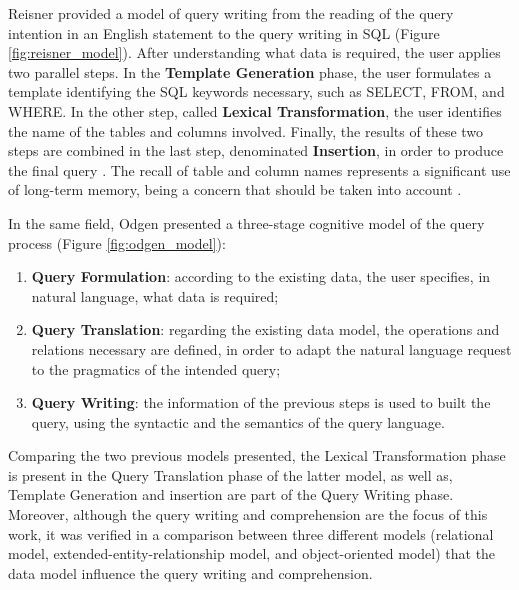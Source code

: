 Reisner \cite{humanFactorStudiesOfDatabaseQueryLanguages} provided a model of query writing from the reading of the query intention in an English statement to the query writing in SQL (Figure \ref{fig:reisner_model}). After understanding what data is required, the user applies two parallel steps. In the \textbf{Template Generation} phase, the user formulates a template identifying the SQL keywords necessary, such as SELECT, FROM, and WHERE. In the other step, called \textbf{Lexical Transformation}, the user identifies the name of the tables and columns involved. Finally, the results of these two steps are combined in the last step, denominated \textbf{Insertion}, in order to produce the final query \cite{humanFactorStudiesOfDatabaseQueryLanguages}. The recall of table and column names represents a significant use of long-term memory, being a concern that should be taken into account \cite{userErrorsInDatabaseQueryComposition}.

In the same field, Odgen \cite{implicationsOfACognitiveModelOfDatabaseQuery} presented a three-stage cognitive model of the query process (Figure \ref{fig:odgen_model}):

\begin{enumerate}
  \item \textbf{Query Formulation}: according to the existing data, the user specifies, in natural language, what data is required;
  \item \textbf{Query Translation}: regarding the existing data model, the operations and relations necessary are defined, in order to adapt the natural language request to the pragmatics of the intended query;
  \item \textbf{Query Writing}: the information of the previous steps is used to built the query, using the syntactic and the semantics of the query language.
\end{enumerate}

Comparing the two previous models presented, the Lexical Transformation phase is present in the Query Translation phase of the latter model, as well as, Template Generation and insertion are part of the Query Writing phase. \cite{anEvaluationOfNoviceEndUserComputingPerformance} Moreover, although the query writing and comprehension are the focus of this work, it was verified in a comparison between three different models (relational model, extended-entity-relationship model, and object-oriented model) that the data model influence the query writing and comprehension. \cite{anEvaluationOfNoviceEndUserComputingPerformance}


